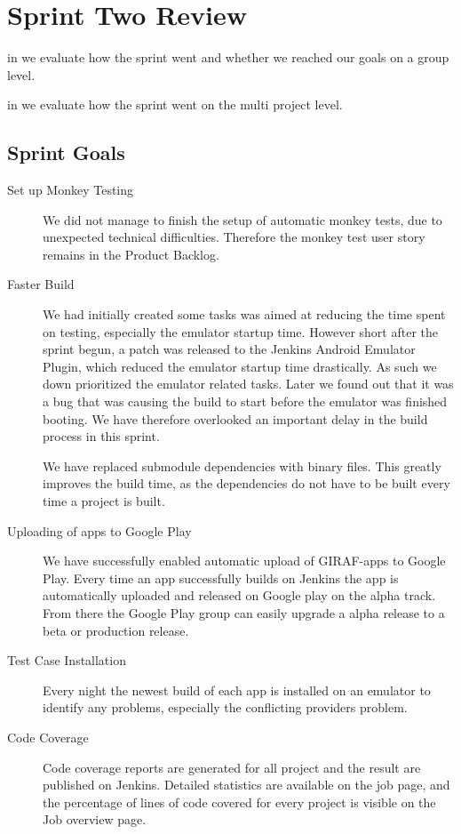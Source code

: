 \chapter{Sprint Two Review}\label{chap:sprint2_end}

\begin{chapterorganization}
  \item in  we evaluate how the sprint went and whether we reached our goals on a group level.
  \item in  we evaluate how the sprint went on the multi project level.
\end{chapterorganization}

\section{Sprint Goals}\label{sec:s2_goals}
\begin{description}
    \item[Set up Monkey Testing] We did not manage to finish the setup of automatic monkey tests, due to unexpected technical difficulties. Therefore the monkey test user story remains in the Product Backlog.
    \item[Faster Build] We had initially created some tasks was aimed at reducing the time spent on testing, especially the emulator startup time. However short after the sprint begun, a patch was released to the Jenkins Android Emulator Plugin, which reduced the emulator startup time drastically. As such we down prioritized the emulator related tasks. Later we found out that it was a bug that was causing the build to start before the emulator was finished booting. We have therefore overlooked an important delay in the build process in this sprint.

    We have replaced submodule dependencies with binary files. This greatly improves the build time, as the dependencies do not have to be built every time a project is built.
    \item[Uploading of apps to Google Play] We have successfully enabled automatic upload of GIRAF-apps to Google Play. Every time an app successfully builds on Jenkins the app is automatically uploaded and released on Google play on the alpha track. From there the Google Play group can easily upgrade a alpha release to a beta or production release.
    \item[Test Case Installation] Every night the newest build of each app is installed on an emulator to identify any problems, especially the conflicting providers problem.
    \item[Code Coverage] Code coverage reports are generated for all project and the result are published on Jenkins. Detailed statistics are available on the job page, and the percentage of lines of code covered for every project is visible on the Job overview page. 
\end{description}

